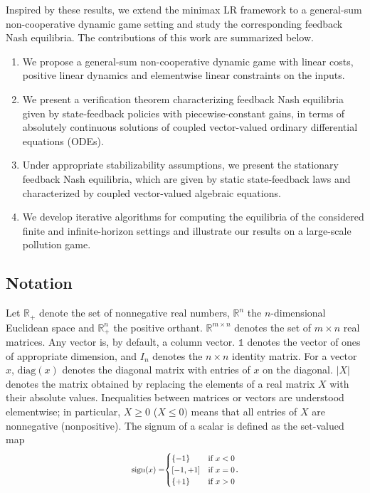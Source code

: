 \documentclass[letterpaper, 10 pt, conference]{ieeeconf}
\theoremstyle{definition}
\begin{document}
Inspired by these results, we extend the minimax LR framework to a general-sum non-cooperative dynamic game setting and study the corresponding feedback Nash equilibria. 
The contributions of this work are summarized below.
\begin{enumerate}[C1]
    \item We propose a general-sum non-cooperative dynamic game with linear costs, positive linear dynamics and elementwise linear constraints on the inputs.
    \item We present a verification theorem characterizing %
    feedback Nash equilibria given by state-feedback policies with piecewise-constant gains, in terms of absolutely continuous solutions of coupled vector-valued ordinary differential equations (ODEs).%
    \item Under appropriate stabilizability assumptions, we present the stationary feedback Nash equilibria, which are given by static state-feedback laws and characterized by coupled vector-valued algebraic equations.
    \item We develop iterative algorithms for computing the equilibria of the considered finite and infinite-horizon settings and illustrate our results on a large-scale pollution game.
\end{enumerate}
\vspace{-3mm}
\subsection{Notation}Let $\mathbb{R}_{+}$ denote the set of nonnegative real numbers, $\mathbb{R}^{n}$ the $n$-dimensional Euclidean space and $\mathbb{R}^{n}_{+}$ the positive orthant. $\mathbb{R}^{m \times n}$ denotes the set of $m \times n$ real matrices. Any vector is, by default, a column vector. $\mathds{1}$ denotes the vector of ones of appropriate dimension, and $I_n$ denotes the $n \times n$ identity matrix. For a vector $x$, $\mathrm{diag}(x)$ denotes the diagonal matrix with entries of $x$ on the diagonal. $\left | X \right |$ denotes the matrix obtained by replacing the elements of a real matrix $X$ with their absolute values. Inequalities between matrices or vectors are understood elementwise; in particular, $X \geq 0$ ($X\leq0)$ means that all entries of $X$ are nonnegative (nonpositive). The signum of a scalar is defined as the set-valued map 
\vspace{-5pt}
$$\scalebox{.8}{$\operatorname{sign}(x) =$}
    \scalebox{.8}{$\ensuremath{
    \begin{cases}
        \{-1\} & \text{if } x < 0\\
        [-1,+1] & \text{if } x = 0\\
        \{+1\} & \text{if } x > 0
    \end{cases}}$}.$$
\end{document}
